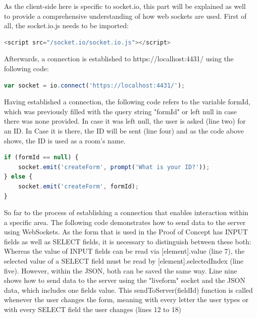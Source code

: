 As the client-side here is specific to socket.io, this part will be explained as well to provide a comprehensive understanding of how web sockets are used. First of all, the socket.io.js needs to be imported:

\begin{lstlisting}[language=javascript,caption={Including the client-side socket.io JavaScript}]
<script src="/socket.io/socket.io.js"></script>
\end{lstlisting}

Afterwards, a connection is established to https://localhost:4431/ using the following code:

\begin{lstlisting}[language=javascript,caption={Establishing socket.io connection from the client-side}]
var socket = io.connect('https://localhost:4431/');
\end{lstlisting}

Having established a connection, the following code refers to the variable formId, which was previously filled with the query string "formId" or left null in case there was none provided. In case it was left null, the user is asked (line two) for an ID. In Case it is there, the ID will be sent (line four) and as the code above shows, the ID is used as a room's name.

\begin{lstlisting}[language=javascript,caption={Joining a specific area – "room"}]
if (formId == null) {
	socket.emit('createForm', prompt('What is your ID?'));
} else {
	socket.emit('createForm', formId);
}
\end{lstlisting}

So far to the process of establishing a connection that enables interaction within a specific area. The following code demonstrates how to send data to the server using WebSockets. As the form that is used in the Proof of Concept has INPUT fields as well as SELECT fields, it is necessary to distinguish between these both: Whereas the value of INPUT fields can be read via [element].value (line 7), the selected value of a SELECT field must be read by [element].selectedIndex (line five). However, within the JSON, both can be saved the same way. Line nine shows how to send data to the server using the "liveform" socket and the JSON data, which includes one fields value. This sendToServer(fieldId) function is called whenever the user changes the form, meaning with every letter the user types or with every SELECT field the user changes (lines 12 to 18)

